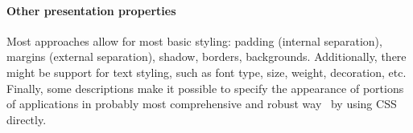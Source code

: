 \paragraph{Other presentation properties}
Most approaches allow for most basic styling: padding (internal separation), margins (external separation), shadow, borders, backgrounds.
Additionally, there might be support for text styling, such as font type, size, weight, decoration, etc.
Finally, some descriptions make it possible to specify the appearance of portions of applications in probably most comprehensive and robust way \textendash\ by using CSS directly.
